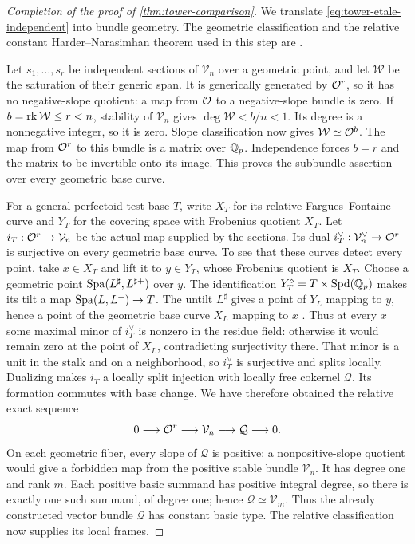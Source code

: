\begin{proof}[Completion of the proof of \cref{thm:tower-comparison}]
We translate \eqref{eq:tower-etale-independent} into bundle
geometry. The geometric classification and the relative constant
Harder--Narasimhan theorem used in this step are
\cite[Theorems II.2.14 and II.2.19]{farguesScholze2021}.

Let $s_1,\ldots,s_r$ be independent sections of $\mathcal V_n$
over a geometric point, and let $\mathcal W$ be the saturation of
their generic span. It is generically generated by $\mathcal O^r$, so it
has no negative-slope quotient: a map from $\mathcal O$ to a negative-slope
bundle is zero. If $b=\operatorname{rk}\mathcal W\leq r<n$, stability of
$\mathcal V_n$ gives
$\deg\mathcal W<b/n<1$. Its degree is a nonnegative integer,
so it is zero. Slope classification now gives
$\mathcal W\simeq\mathcal O^b$. The map from $\mathcal O^r$ to this bundle is
a matrix over $\mathbb Q_p$. Independence forces $b=r$ and the matrix to
be invertible onto its image. This proves the subbundle assertion
over every geometric base curve.

For a general perfectoid test base $T$, write $X_T$ for its relative
Fargues--Fontaine curve and $Y_T$ for the covering space with Frobenius
quotient $X_T$. Let $i_T:\mathcal O^r\to\mathcal V_n$ be the actual map
supplied by the sections.
Its dual $i_T^\vee:\mathcal V_n^\vee\to\mathcal O^r$ is surjective on every
geometric base curve. To see that these curves detect every point,
take $x\in X_T$ and lift it to $y\in Y_T$, whose Frobenius quotient
is $X_T$.
Choose a geometric point $\operatorname{Spa}(L^\sharp,L^{\sharp+})$ over $y$.
The identification $Y_T^\diamond=T\times\operatorname{Spd}(\mathbb Q_p)$
makes its tilt a map $\operatorname{Spa}(L,L^+)\to T$. The untilt $L^\sharp$ gives
a point of $Y_L$ mapping to $y$, hence a point of the geometric base
curve $X_L$ mapping to $x$
\cite[Definition II.1.15 and Propositions II.1.16--II.1.18]{farguesScholze2021}.
Thus at every $x$ some maximal minor of $i_T^\vee$ is nonzero in
the residue field: otherwise it would remain zero at the point of
$X_L$, contradicting surjectivity there. That minor is a unit in the
stalk and on a neighborhood, so $i_T^\vee$ is surjective and splits
locally. Dualizing makes $i_T$ a locally split injection with locally
free cokernel $\mathcal Q$. Its formation commutes with base change.
We have therefore obtained the relative exact sequence
\begin{equation}\label{eq:tower-bundle-sequence}
 0\longrightarrow\mathcal O^r\longrightarrow\mathcal V_n
   \longrightarrow\mathcal Q\longrightarrow0.
\end{equation}
On each geometric fiber, every slope of $\mathcal Q$ is positive:
a nonpositive-slope quotient
would give a forbidden map from the positive stable bundle
$\mathcal V_n$. It has degree one and rank $m$. Each positive basic
summand has positive integral degree, so there is exactly one such
summand, of degree one; hence $\mathcal Q\simeq\mathcal V_m$.
Thus the already constructed vector bundle $\mathcal Q$ has constant
basic type. The relative classification
\cite[Theorem II.2.19(ii), including the dual-surjection argument
in its proof]{farguesScholze2021}
now supplies its local frames.


\end{proof}
